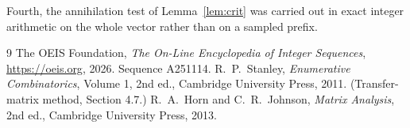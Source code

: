 \documentclass[11pt,a4paper]{article}
\theoremstyle{plain}
\theoremstyle{definition}
\begin{document}
Fourth, the annihilation test of Lemma~\ref{lem:crit} was carried out in exact integer
arithmetic on the whole vector rather than on a sampled prefix.

\begin{thebibliography}{9}
 The OEIS Foundation, \emph{The On-Line Encyclopedia of Integer
Sequences}, \url{https://oeis.org}, 2026. Sequence A251114.
 R.~P.~Stanley, \emph{Enumerative Combinatorics}, Volume 1, 2nd ed.,
Cambridge University Press, 2011. (Transfer-matrix method, Section 4.7.)
 R.~A.~Horn and C.~R.~Johnson, \emph{Matrix Analysis}, 2nd ed., Cambridge
University Press, 2013.
\end{thebibliography}
\end{document}
